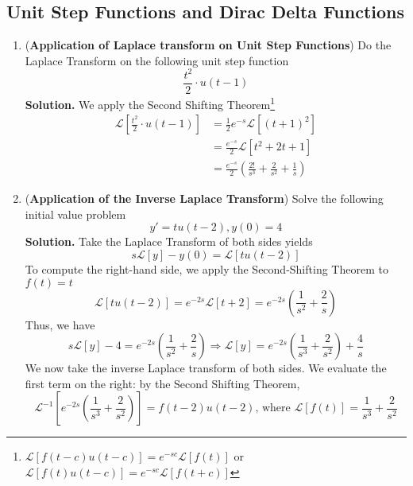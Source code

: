 \documentclass{article}
\begin{document}
\subsection{Unit Step Functions and Dirac Delta Functions}
\begin{enumerate}
    \item (\textbf{Application of Laplace transform on Unit Step Functions}) Do the Laplace Transform on the following unit step function
    \begin{equation}
        \frac{t^2}{2}\cdot u(t-1)
    \end{equation}
    \textbf{Solution.} We apply the Second Shifting Theorem\footnote{$\mathcal{L}[f(t-c)u(t-c)]=e^{-sc}\mathcal{L}[f(t)]$ or $\mathcal{L}[f(t)u(t-c)]=e^{-sc}\mathcal{L}[f(t+c)]$}
    \begin{align*}
        \mathcal{L}[\frac{t^2}{2}\cdot u(t-1)]&=\frac{1}{2}e^{-s}\mathcal{L}[(t+1)^2]\\
        &=\frac{e^{-s}}{2}\mathcal{L}[t^2+2t+1]\\
        &=\frac{e^{-s}}{2}(\frac{2!}{s^3}+\frac{2}{s^2}+\frac{1}{s})
    \end{align*}
    \item (\textbf{Application of the Inverse Laplace Transform}) Solve the following initial value problem
    \begin{equation}
        y'=tu(t-2),y(0)=4
    \end{equation}
    \textbf{Solution.} Take the Laplace Transform of both sides yields
    \begin{equation*}
        s\mathcal{L}[y]-y(0)=\mathcal{L}[tu(t-2)]
    \end{equation*}
    To compute the right-hand side, we apply the Second-Shifting Theorem to $f(t)=t$
    \begin{equation*}
        \mathcal{L}[tu(t-2)]=e^{-2s}\mathcal{L}[t+2]=e^{-2s}(\frac{1}{s^2}+\frac{2}{s})
    \end{equation*}
    Thus, we have
    \begin{equation*}
        s\mathcal{L}[y]-4=e^{-2s}(\frac{1}{s^2}+\frac{2}{s})\Rightarrow \mathcal{L}[y]=e^{-2s}(\frac{1}{s^3}+\frac{2}{s^2})+\frac{4}{s}
    \end{equation*}
    We now take the inverse Laplace transform of both sides. We evaluate the first term on the right: by the Second Shifting Theorem,
    \begin{equation*}
        \mathcal{L}^{-1}[e^{-2s}(\frac{1}{s^3}+\frac{2}{s^2})]=f(t-2)u(t-2)\text{, where }\mathcal{L}[f(t)]=\frac{1}{s^3}+\frac{2}{s^2}

\end{equation*}
\end{enumerate}
\end{document}
